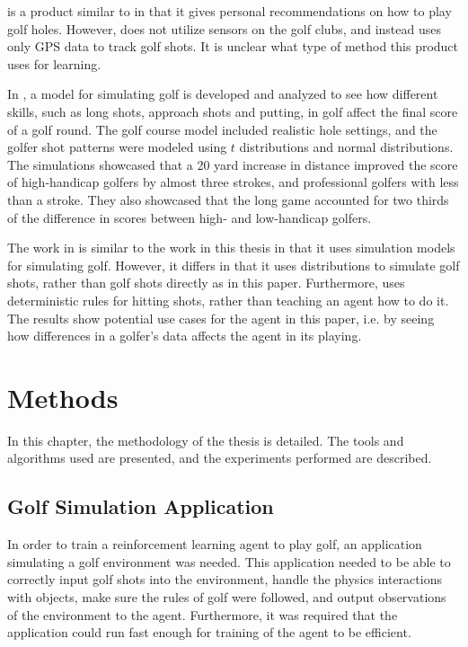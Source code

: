 \documentclass{kththesis}
\begin{document}
\textcite{HelloBir63:online} is a product similar to \textcite{ArccosGo0:online} in that it gives personal recommendations on how to play golf holes. However, \textcite{HelloBir63:online} does not utilize sensors on the golf clubs, and instead uses only GPS data to track golf shots. It is unclear what type of method this product uses for learning.

In \textcite{ko2012simulation}, a model for simulating golf is developed and analyzed to see how different skills, such as long shots, approach shots and putting, in golf affect the final score of a golf round. The golf course model included realistic hole settings, and the golfer shot patterns were modeled using $t$ distributions and normal distributions. The simulations showcased that a 20 yard increase in distance improved the score of high-handicap golfers by almost three strokes, and professional golfers with less than a stroke. They also showcased that the long game accounted for two thirds of the difference in scores between high- and low-handicap golfers.

The work in \textcite{ko2012simulation} is similar to the work in this thesis in that it uses simulation models for simulating golf. However, it differs in that it uses distributions to simulate golf shots, rather than golf shots directly as in this paper. Furthermore, \textcite{ko2012simulation} uses deterministic rules for hitting shots, rather than teaching an agent how to do it. The results show potential use cases for the agent in this paper, i.e. by seeing how differences in a golfer's data affects the agent in its playing.

\chapter{Methods}
\label{chapter:methods}
In this chapter, the methodology of the thesis is detailed. The tools and algorithms used are presented, and the experiments performed are described. 

\section{Golf Simulation Application}
In order to train a reinforcement learning agent to play golf, an application simulating a golf environment was needed. This application needed to be able to correctly input golf shots into the environment, handle the physics interactions with objects, make sure the rules of golf were followed, and output observations of the environment to the agent. Furthermore, it was required that the application could run fast enough for training of the agent to be efficient.
\end{document}

